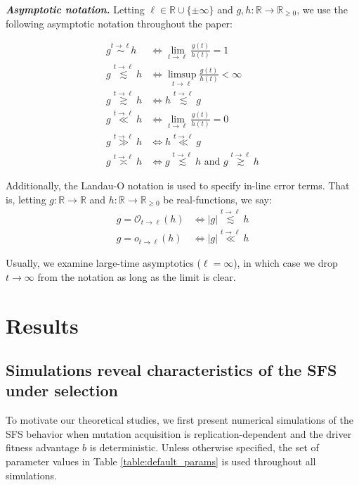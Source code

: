 \documentclass{article}
\numberwithin{equation}{section}
\newcommand{\gsimas}[2]{\overset{{#1}\to {#2}}{\gtrsim}}
\newcommand{\lsimas}[2]{\overset{{#1}\to {#2}}{\lesssim}}
\newcommand{\simas}[2]{\overset{{#1}\to {#2}}{\sim}}
\newcommand{\ggas}[2]{\overset{{#1}\to {#2}}{\gg}}
\newcommand{\llas}[2]{\overset{{#1}\to {#2}}{\ll}}
\newcommand{\ordas}[2]{\overset{{#1}\to {#2}}{\asymp}}
\begin{document}
{\bf \em Asymptotic notation.} Letting $\ell\in \mathbb{R}\cup \{\pm \infty\}$ and $g,h:\mathbb{R}\to \mathbb{R}_{\geq 0}$, we use the following asymptotic notation throughout the paper:

\begin{align*}
    g\simas{t}{\ell}h&\Longleftrightarrow \lim_{t\to\ell}\frac{g(t)}{h(t)}=1\\
    g\lsimas{t}{\ell} h&\Longleftrightarrow \limsup_{t\to\ell}\frac{g(t)}{h(t)}<\infty\\
    g\gsimas{t}{\ell} h&\Longleftrightarrow h\lsimas{t}{\ell} g\\
    g\llas{t}{\ell} h&\Longleftrightarrow \lim_{t\to \ell}\frac{g(t)}{h(t)}=0\\
    g\ggas{t}{\ell} h&\Longleftrightarrow h\llas{t}{\ell} g\\
    g\ordas{t}{\ell} h&\Longleftrightarrow g\lsimas{t}{\ell} h\text{ and }g\gsimas{t}{\ell} h
\end{align*}

Additionally, the Landau-O notation is used to specify in-line error terms. That is, letting $g:\mathbb{R}\to \mathbb{R}$ and $h:\mathbb{R}\to \mathbb{R}_{\geq 0}$ be real-functions, we say:
\begin{align*}
    g=\mathcal{O}_{t\to \ell}(h)&\Longleftrightarrow |g|\lsimas{t}{\ell}h\\
    g=o_{t\to \ell}(h)&\Longleftrightarrow |g|\llas{t}{\ell}h
\end{align*}

Usually, we examine large-time asymptotics ($\ell = \infty$), in which case we drop $t\to\infty$ from the notation as long as the limit is clear.




\section{Results}



\subsection{Simulations reveal characteristics of the SFS under selection}
To motivate our theoretical studies, we first present numerical simulations of the SFS behavior when mutation acquisition is replication-dependent and the driver fitness advantage $b$ is deterministic.
Unless otherwise specified, the set of parameter values in Table \ref{table:default_params} is used throughout all simulations. 
\end{document}
